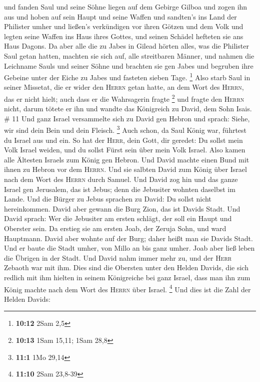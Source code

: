 und fanden Saul und seine Söhne liegen auf dem Gebirge Gilboa
 und zogen ihn aus und hoben auf sein Haupt und seine
Waffen und sandten's ins Land der Philister umher und ließen's
verkündigen vor ihren Götzen und dem Volk  und legten
seine Waffen ins Haus ihres Gottes, und seinen Schädel hefteten sie ans
Haus Dagons.  Da aber alle die zu Jabes in Gilead hörten
alles, was die Philister Saul getan hatten,  machten sie
sich auf, alle streitbaren Männer, und nahmen die Leichname Sauls und
seiner Söhne und brachten sie gen Jabes und begruben ihre Gebeine unter
der Eiche zu Jabes und fasteten sieben Tage. \footnote{\textbf{10:12}
  2Sam 2,5}  Also starb Saul in seiner Missetat, die er
wider den \textsc{Herrn} getan hatte, an dem Wort des \textsc{Herrn},
das er nicht hielt; auch dass er die Wahrsagerin fragte \footnote{\textbf{10:13}
  1Sam 15,11; 1Sam 28,8}  und fragte den \textsc{Herrn}
nicht, darum tötete er ihn und wandte das Königreich zu David, dem Sohn
Isais. \# 11  Und ganz Israel versammelte sich zu David
gen Hebron und sprach: Siehe, wir sind dein Bein und dein Fleisch.
\footnote{\textbf{11:1} 1Mo 29,14}  Auch schon, da Saul
König war, führtest du Israel aus und ein. So hat der \textsc{Herr},
dein Gott, dir geredet: Du sollst mein Volk Israel weiden, und du sollst
Fürst sein über mein Volk Israel.  Also kamen alle
Ältesten Israels zum König gen Hebron. Und David machte einen Bund mit
ihnen zu Hebron vor dem \textsc{Herrn}. Und sie salbten David zum König
über Israel nach dem Wort des \textsc{Herrn} durch Samuel.
 Und David zog hin und das ganze Israel gen Jerusalem, das
ist Jebus; denn die Jebusiter wohnten daselbst im Lande. 
Und die Bürger zu Jebus sprachen zu David: Du sollst nicht hereinkommen.
David aber gewann die Burg Zion, das ist Davids Stadt. 
Und David sprach: Wer die Jebusiter am ersten schlägt, der soll ein
Haupt und Oberster sein. Da erstieg sie am ersten Joab, der Zeruja Sohn,
und ward Hauptmann.  David aber wohnte auf der Burg; daher
heißt man sie Davids Stadt.  Und er baute die Stadt umher,
von Millo an bis ganz umher. Joab aber ließ leben die Übrigen in der
Stadt.  Und David nahm immer mehr zu, und der
\textsc{Herr} Zebaoth war mit ihm.  Dies sind die
Obersten unter den Helden Davids, die sich redlich mit ihm hielten in
seinem Königreiche bei ganz Israel, dass man ihn zum König machte nach
dem Wort des \textsc{Herrn} über Israel. \footnote{\textbf{11:10} 2Sam
  23,8-39}  Und dies ist die Zahl der Helden Davids:
